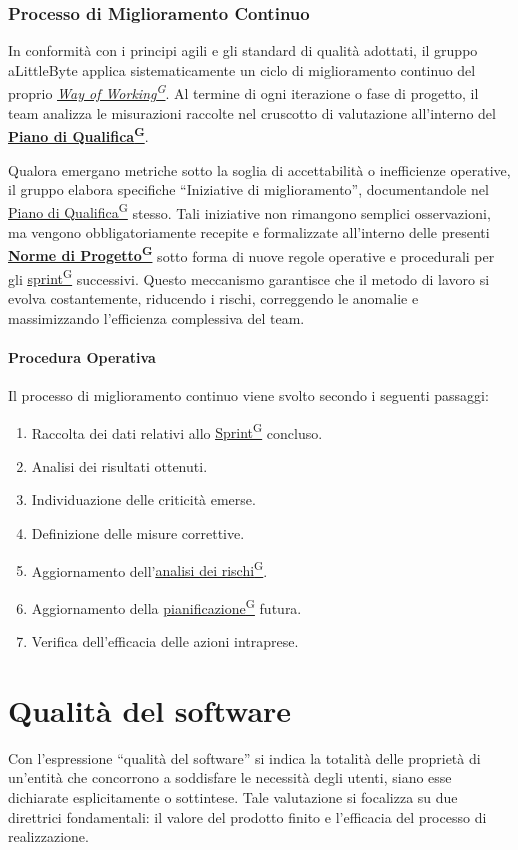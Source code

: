 \documentclass[a4paper,12pt]{article}
\providecommand{\glslink}[2]{\href{https://alittlebyte-19.github.io/Documentazione/glossario.html\#gls-#1}{\underline{#2}\textsuperscript{\scriptsize G}}}
\begin{document}
\subsubsection{Processo di Miglioramento Continuo}
In conformità con i principi agili e gli standard di qualità adottati, il gruppo aLittleByte applica sistematicamente un ciclo di miglioramento continuo del proprio \textit{\glslink{way-of-working-wow}{Way of Working}}. Al termine di ogni iterazione o fase di progetto, il team analizza le misurazioni raccolte nel cruscotto di valutazione all'interno del \textbf{\glslink{piano-di-qualifica}{Piano di Qualifica}}. 

Qualora emergano metriche sotto la soglia di accettabilità o inefficienze operative, il gruppo elabora specifiche ``Iniziative di miglioramento'', documentandole nel \glslink{piano-di-qualifica}{Piano di Qualifica} stesso. Tali iniziative non rimangono semplici osservazioni, ma vengono obbligatoriamente recepite e formalizzate all'interno delle presenti \textbf{\glslink{norme-di-progetto}{Norme di Progetto}} sotto forma di nuove regole operative e procedurali per gli \glslink{sprint}{sprint} successivi. Questo meccanismo garantisce che il metodo di lavoro si evolva costantemente, riducendo i rischi, correggendo le anomalie e massimizzando l'efficienza complessiva del team.

\paragraph{Procedura Operativa}
Il processo di miglioramento continuo viene svolto secondo i seguenti passaggi:

\begin{enumerate}
    \item Raccolta dei dati relativi allo \glslink{sprint}{Sprint} concluso.
    \item Analisi dei risultati ottenuti.
    \item Individuazione delle criticità emerse.
    \item Definizione delle misure correttive.
    \item Aggiornamento dell'\glslink{analisi-dei-rischi}{analisi dei rischi}.
    \item Aggiornamento della \glslink{pianificazione}{pianificazione} futura.
    \item Verifica dell'efficacia delle azioni intraprese.
\end{enumerate}

\section{Qualità del software}
Con l'espressione ``qualità del software'' si indica la totalità delle proprietà di un'entità che concorrono a soddisfare le necessità degli utenti, siano esse dichiarate esplicitamente o sottintese. Tale valutazione si focalizza su due direttrici fondamentali: il valore del prodotto finito e l'efficacia del processo di realizzazione.
\end{document}
